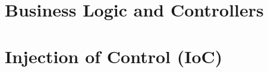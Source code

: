 \section{Business Logic and Controllers}

% 
% 
% 
% 
\section{Injection of Control (IoC)}\label{ch01:01:IoC}
